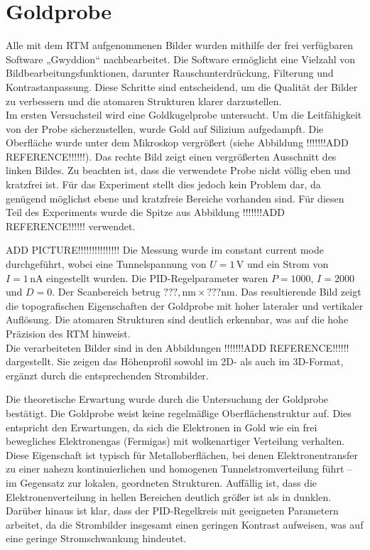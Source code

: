 \chapter{Goldprobe}
Alle mit dem RTM aufgenommenen Bilder wurden mithilfe der frei verfügbaren Software „Gwyddion“ nachbearbeitet.
Die Software ermöglicht eine Vielzahl von Bildbearbeitungsfunktionen, darunter Rauschunterdrückung, Filterung und Kontrastanpassung. Diese Schritte sind entscheidend, um die Qualität der Bilder zu verbessern und die atomaren Strukturen klarer darzustellen.\\
Im ersten Versuchsteil wird eine Goldkugelprobe untersucht. Um die Leitfähigkeit von der Probe sicherzustellen, wurde Gold auf Silizium aufgedampft. Die Oberfläche wurde unter dem Mikroskop vergrößert (siehe Abbildung !!!!!!!ADD REFERENCE!!!!!!). 
Das rechte Bild zeigt einen vergrößerten Ausschnitt des linken Bildes. Zu beachten ist, dass die verwendete Probe nicht völlig eben und kratzfrei ist. Für das Experiment stellt dies jedoch kein Problem dar, da genügend möglichst ebene und kratzfreie Bereiche vorhanden sind. Für diesen Teil des Experiments wurde die Spitze aus Abbildung !!!!!!!ADD REFERENCE!!!!!! verwendet.

 ADD PICTURE!!!!!!!!!!!!!!!
Die Messung wurde im constant current mode durchgeführt, wobei eine Tunnelspannung von $U = 1\,\text{V}$ und ein Strom von $I = 1\,\text{nA}$ eingestellt wurden. Die PID-Regelparameter waren $P = 1000$, $I = 2000$ und $D = 0$. Der Scanbereich betrug $???,\text{nm} \times ???\text{nm}$. Das resultierende Bild zeigt die topografischen Eigenschaften der Goldprobe mit hoher lateraler und vertikaler Auflösung. Die atomaren Strukturen sind deutlich erkennbar, was auf die hohe Präzision des RTM hinweist.\\

Die verarbeiteten Bilder sind in den Abbildungen !!!!!!!ADD REFERENCE!!!!!! dargestellt. Sie zeigen das Höhenprofil sowohl im 2D- als auch im 3D-Format, ergänzt durch die entsprechenden Strombilder.

Die theoretische Erwartung wurde durch die Untersuchung der Goldprobe bestätigt. Die Goldprobe weist keine regelmäßige Oberflächenstruktur auf. Dies entspricht den Erwartungen, da sich die Elektronen in Gold wie ein frei bewegliches Elektronengas (Fermigas) mit wolkenartiger Verteilung verhalten. Diese Eigenschaft ist typisch für Metalloberflächen, bei denen Elektronentransfer zu einer nahezu kontinuierlichen und homogenen Tunnelstromverteilung führt – im Gegensatz zur lokalen, geordneten Strukturen. Auffällig ist, dass die Elektronenverteilung in hellen Bereichen deutlich größer ist als in dunklen. Darüber hinaus ist klar, dass der PID-Regelkreis mit geeigneten Parametern arbeitet, da die Strombilder insgesamt einen geringen Kontrast aufweisen, was auf eine geringe Stromschwankung hindeutet. %

